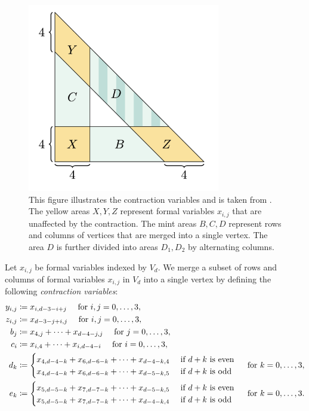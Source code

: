 \begin{figure}[H]\label{fig:contractions-42342432}
    \centering
    \includegraphics[width=0.75\textwidth]{assets/contactions-4.png}
    \caption{This figure illustrates the contraction variables and is taken from \cite{bik2022classifying}. The yellow areas \( X, Y, Z \) represent formal variables \( x_{i,j} \) that are unaffected by the contraction. The mint areas \( B, C, D \) represent rows and columns of vertices that are merged into a single vertex. The area \( D \) is further divided into areas \( D_1, D_2 \) by alternating columns.}
\end{figure}

\begin{definition}
Let \( x_{i,j} \) be formal variables indexed by \( V_d \). We merge a subset of rows and columns of formal variables \( x_{i,j} \) in \( V_d \) into a single vertex by defining the following \emph{contraction variables}:
\begin{align*}
    y_{i,j} &\coloneqq x_{i, d-3-i+j} \quad \text{ for } i,j = 0, \dots, 3, \\
    z_{i,j} &\coloneqq x_{d-3-j+i,j} \quad \text{ for } i,j = 0, \dots, 3, \\
    b_j &\coloneqq x_{4,j} + \dots + x_{d-4-j,j} \quad \text{ for } j = 0, \dots, 3, \\
    c_i &\coloneqq x_{i,4} + \dots + x_{i,d-4-i} \quad \text{ for } i = 0, \dots, 3, \\
    d_k &\coloneqq \begin{cases}
        x_{4,d-4-k} + x_{6,d-6-k} + \dots + x_{d-4-k,4} & \text{ if \( d + k \) is even} \\
        x_{4,d-4-k} + x_{6,d-6-k} + \dots + x_{d-5-k,5} & \text{ if \( d + k \) is odd}
    \end{cases} \quad \text{ for } k = 0, \dots, 3, \\
    e_k &\coloneqq \begin{cases}
        x_{5,d-5-k} + x_{7,d-7-k} + \dots + x_{d-5-k,5} & \text{ if \( d + k \) is even} \\
        x_{5,d-5-k} + x_{7,d-7-k} + \dots + x_{d-4-k,4} & \text{ if \( d + k \) is odd}
    \end{cases} \quad \text{ for } k = 0, \dots, 3.
\end{align*}
\end{definition}


